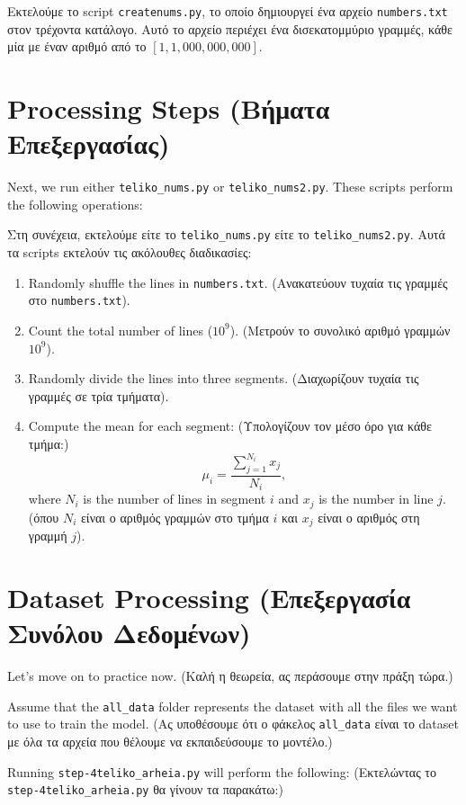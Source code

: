 \documentclass[a4paper,11pt]{article}
\begin{document}
Εκτελούμε το script \texttt{createnums.py}, το οποίο δημιουργεί ένα αρχείο \texttt{numbers.txt} στον τρέχοντα κατάλογο. Αυτό το αρχείο περιέχει ένα δισεκατομμύριο γραμμές, κάθε μία με έναν αριθμό από το $[1,1,000,000,000]$.

\section{Processing Steps (Βήματα Επεξεργασίας)}
Next, we run either \texttt{teliko\_nums.py} or \texttt{teliko\_nums2.py}. These scripts perform the following operations:

Στη συνέχεια, εκτελούμε είτε το \texttt{teliko\_nums.py} είτε το \texttt{teliko\_nums2.py}. Αυτά τα scripts εκτελούν τις ακόλουθες διαδικασίες:

\begin{enumerate}
    \item Randomly shuffle the lines in \texttt{numbers.txt}. (Ανακατεύουν τυχαία τις γραμμές στο \texttt{numbers.txt}).
    \item Count the total number of lines ($10^9$). (Μετρούν το συνολικό αριθμό γραμμών $10^9$).
    \item Randomly divide the lines into three segments. (Διαχωρίζουν τυχαία τις γραμμές σε τρία τμήματα).
    \item Compute the mean for each segment: (Υπολογίζουν τον μέσο όρο για κάθε τμήμα:)
    \begin{equation}
        \mu_i = \frac{\sum_{j=1}^{N_i} x_j}{N_i},
    \end{equation}
    where $N_i$ is the number of lines in segment $i$ and $x_j$ is the number in line $j$. (όπου $N_i$ είναι ο αριθμός γραμμών στο τμήμα $i$ και $x_j$ είναι ο αριθμός στη γραμμή $j$).
\end{enumerate}
{}
\section{Dataset Processing (Επεξεργασία Συνόλου Δεδομένων)}
Let's move on to practice now. (Καλή η θεωρεία, ας περάσουμε στην πράξη τώρα.)

Assume that the \texttt{all\_data} folder represents the dataset with all the files we want to use to train the model. (Ας υποθέσουμε ότι ο φάκελος \texttt{all\_data} είναι το dataset με όλα τα αρχεία που θέλουμε να εκπαιδεύσουμε το μοντέλο.)

Running \texttt{step-4teliko\_arheia.py} will perform the following: (Εκτελώντας το \texttt{step-4teliko\_arheia.py} θα γίνουν τα παρακάτω:)
\end{document}
